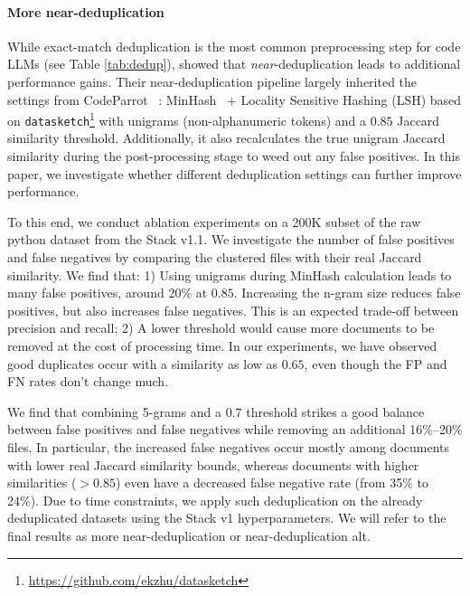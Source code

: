 \documentclass[10pt]{article} \usepackage{iclr2023_conference,times}
\begin{document}
\paragraph{More near-deduplication} While exact-match deduplication is the most common preprocessing step for code LLMs (see Table \ref{tab:dedup}), \citet{Kocetkov2022TheStack} showed that \emph{near}-deduplication leads to additional performance gains. Their near-deduplication pipeline largely inherited the settings from CodeParrot ~\citep{Tunstall2022-nw}: MinHash~\citep{broder2000identifying} + Locality Sensitive Hashing (LSH) based on \texttt{datasketch}\footnote{\url{https://github.com/ekzhu/datasketch}} with unigrams (non-alphanumeric tokens) and a $0.85$ Jaccard similarity threshold. Additionally, it also recalculates the true unigram Jaccard similarity during the post-processing stage to weed out any false positives. In this paper, we investigate whether different deduplication settings can further improve performance.

To this end, we conduct ablation experiments on a 200K subset of the raw python dataset from the Stack v1.1. We investigate the number of false positives and false negatives by comparing the clustered files with their real Jaccard similarity. We find that: 1) Using unigrams during MinHash calculation leads to many false positives, around 20\% at $0.85$. Increasing the n-gram size reduces false positives, but also increases false negatives. This is an expected trade-off between precision and recall; 2) A lower threshold would cause more documents to be removed at the cost of processing time. In our experiments, we have observed good duplicates occur with a similarity as low as $0.65$, even though the FP and FN rates don't change much.

We find that combining 5-grams and a $0.7$ threshold strikes a good balance between false positives and false negatives while removing an additional 16\%--20\% files. In particular, the increased false negatives occur mostly among documents with lower real Jaccard similarity bounds, whereas documents with higher similarities ($> 0.85$) even have a decreased false negative rate (from 35\% to 24\%). Due to time constraints, we apply such deduplication on the already deduplicated datasets using the Stack v1 hyperparameters. We will refer to the final results as more near-deduplication or near-deduplication alt. 
\end{document}
